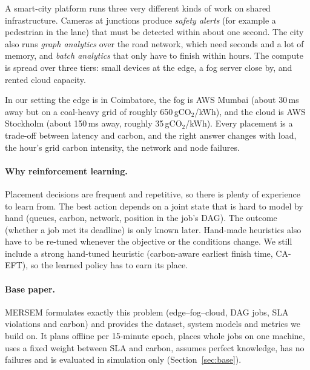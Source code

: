 \documentclass[11pt,a4paper]{article}
\newcommand{\gco}{gCO$_2$}
\begin{document}
A smart-city platform runs three very different kinds of work on shared infrastructure. Cameras at junctions produce \emph{safety alerts} (for example a pedestrian in the lane) that must be detected within about one second. The city also runs \emph{graph analytics} over the road network, which need seconds and a lot of memory, and \emph{batch analytics} that only have to finish within hours. The compute is spread over three tiers: small devices at the edge, a fog server close by, and rented cloud capacity.

In our setting the edge is in Coimbatore, the fog is AWS Mumbai (about 30\,ms away but on a coal-heavy grid of roughly 650\,\gco/kWh), and the cloud is AWS Stockholm (about 150\,ms away, roughly 35\,\gco/kWh). Every placement is a trade-off between latency and carbon, and the right answer changes with load, the hour's grid carbon intensity, the network and node failures.

\paragraph{Why reinforcement learning.} Placement decisions are frequent and repetitive, so there is plenty of experience to learn from. The best action depends on a joint state that is hard to model by hand (queues, carbon, network, position in the job's DAG). The outcome (whether a job met its deadline) is only known later. Hand-made heuristics also have to be re-tuned whenever the objective or the conditions change. We still include a strong hand-tuned heuristic (carbon-aware earliest finish time, CA-EFT), so the learned policy has to earn its place.

\paragraph{Base paper.} MERSEM \cite{mersem} formulates exactly this problem (edge--fog--cloud, DAG jobs, SLA violations and carbon) and provides the dataset, system models and metrics we build on. It plans offline per 15-minute epoch, places whole jobs on one machine, uses a fixed weight between SLA and carbon, assumes perfect knowledge, has no failures and is evaluated in simulation only (Section~\ref{sec:base}).
\end{document}
